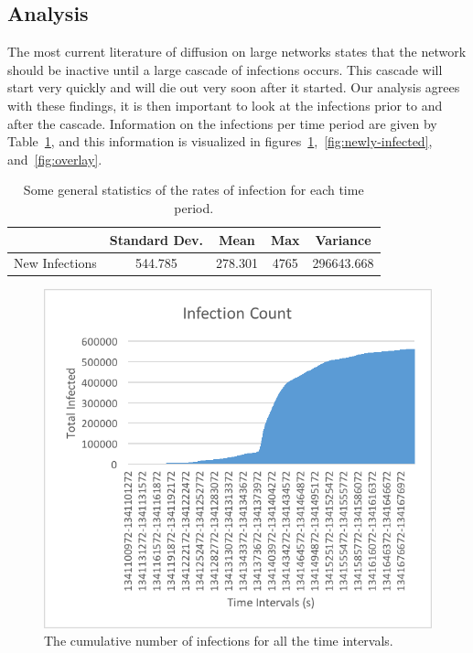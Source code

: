 \documentclass[12pt, oneside, openany]{article} %
\begin{document}
\subsection{Analysis}
The most current literature of diffusion on large networks states that the network should be inactive until a large cascade of infections occurs. This cascade will start very quickly and will die out very soon after it started. Our analysis agrees with these findings, it is then important to look at the infections prior to and after the cascade. Information on the infections per time period are given by Table~\ref{tbl:stats}, and this information is visualized in figures~\ref{fig:infection-count},~\ref{fig:newly-infected}, and~\ref{fig:overlay}.

\begin{table}
\centering
\begin{tabular}{| c || c | c | c | c |}
	\hline
   		& Standard Dev. & Mean & Max & Variance \\
   	\hline\hline
  	New Infections & 544.785 & 278.301 & 4765 & 296643.668 \\
	\hline
\end{tabular}
  \caption{Some general statistics of the rates of infection for each time period.}
  \label{tbl:stats}
\end{table}

\begin{figure}
\centering
    \includegraphics{infection-count.png}
    \caption{The cumulative number of infections for all the time intervals.}
    \label{fig:infection-count}
\end{figure}
\end{document}
